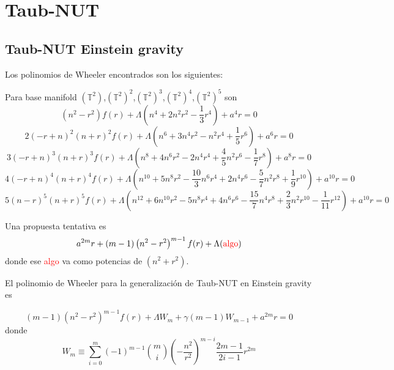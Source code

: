 \chapter{Taub-NUT}
\section{Taub-NUT Einstein gravity}
Los polinomios de Wheeler encontrados son los siguientes:

Para base manifold $(\mathbb{T}^2)$,$(\mathbb{T}^2)^2$,$(\mathbb{T}^2)^3$,$(\mathbb{T}^2)^4$,$(\mathbb{T}^2)^5$ son
\begin{equation*}
    \left(n^{2}-r^{2}\right) f \! \left(r \right)+\Lambda \left(n^{4}+2 n^{2} r^{2}-\frac{1}{3} r^{4}\right)+a^{4} r=0
\end{equation*}
\begin{equation*}
    2 \left(-r +n \right)^{2} \left(n +r \right)^{2} f \! \left(r \right)+\Lambda \left(n^{6}+3 n^{4} r^{2}-n^{2} r^{4}+\frac{1}{5} r^{6}\right)+a^{6} r=0
\end{equation*}
\begin{equation*}
    3 \left(-r +n \right)^{3} \left(n +r \right)^{3} f \! \left(r \right)+\Lambda \left(n^{8}+4 n^{6} r^{2}-2 n^{4} r^{4}+\frac{4}{5} n^{2} r^{6}-\frac{1}{7} r^{8}\right)+a^{8} r=0
\end{equation*}
\begin{equation*}
    4 \left(-r +n \right)^{4} \left(n +r \right)^{4} f \! \left(r \right)+\Lambda \left(n^{10}+5 n^{8} r^{2}-\frac{10}{3} n^{6} r^{4}+2 n^{4} r^{6}-\frac{5}{7} n^{2} r^{8}+\frac{1}{9} r^{10}\right)+a^{10} r=0
\end{equation*}
\begin{equation*}
    5 \left(n -r \right)^{5} \left(n +r \right)^{5} f \! \left(r \right)+\Lambda \left(n^{12}+6 n^{10} r^{2}-5 n^{8} r^{4}+4 n^{6} r^{6}-\frac{15}{7} n^{4} r^{8}+\frac{2}{3} n^{2} r^{10}-\frac{1}{11} r^{12}\right)+a^{10} r=0
\end{equation*}

Una propuesta tentativa es
\begin{equation*}
    a^{2 m} r +\left(m -1\right) \left(n^{2}-r^{2}\right)^{m -1} f \! \left(r \right)+\Lambda (\textcolor{red}{\rm algo})
\end{equation*}
donde ese \textcolor{red}{algo} va como potencias de $(n^2+r^2)$.

El polinomio de Wheeler para la generalización de Taub-NUT en Einstein gravity es
\begin{tcolorbox}
\begin{equation*}
    (m-1)(n^2-r^2)^{m-1}f(r)+\Lambda W_m +\gamma(m-1)W_{m-1}+a^{2m}r=0
\end{equation*}
donde
\begin{equation*}
    W_m\equiv \sum_{i=0}^m(-1)^{m-1}\binom{m}{i}\left(-\frac{n^2}{r^2}\right)^{m-i}\frac{2m-1}{2i-1}r^{2m}
\end{equation*}   
\end{tcolorbox}


